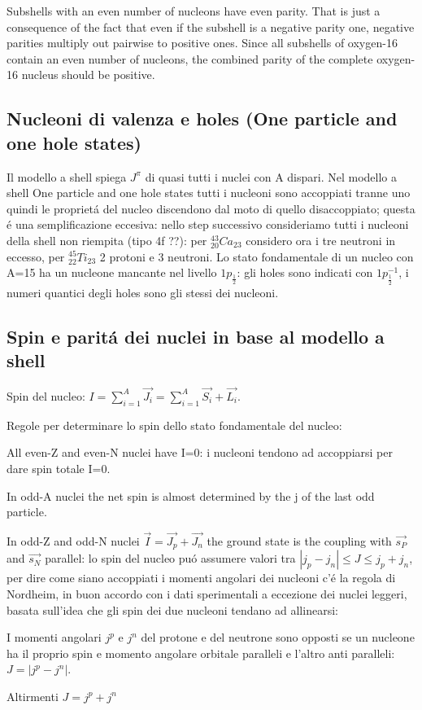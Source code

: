 \documentclass[main.tex]{subfiles}
\begin{document}
Subshells with an even number of nucleons have even parity.
That is just a consequence of the fact that even if the subshell is a negative parity one, negative parities multiply out pairwise to positive ones. Since all subshells of oxygen-16 contain an even number of nucleons, the combined parity of the complete oxygen-16 nucleus should be positive.


\subsection{Nucleoni di valenza e holes (One particle and one hole states)}
Il modello a shell spiega $J^\pi$ di quasi tutti i nuclei con A dispari.
Nel modello a shell One particle and one hole states tutti i nucleoni sono accoppiati tranne uno quindi le propriet\'a del nucleo discendono dal moto di quello disaccoppiato; questa \'e una semplificazione eccesiva: nello step successivo consideriamo tutti i nucleoni della shell non riempita (tipo 4f ??): per $^{43}_{20}Ca_{23}$ considero ora i tre neutroni in eccesso, per $^{45}_{22}Ti_{23}$ 2 protoni e 3 neutroni.
Lo stato fondamentale di un nucleo con A=15 ha un nucleone mancante nel livello $1p_\frac{1}{2}$: gli holes sono indicati con $1p_\frac{1}{2}^{-1}$, i numeri quantici degli holes sono gli stessi dei nucleoni.




\subsection{Spin e parit\'a dei nuclei in base al modello a shell}

Spin del nucleo: $I=\sum_{i=1}^A\vec{J_i}=\sum_{i=1}^A{\vec{S_i}+\vec{L_i}}$.

Regole per determinare lo spin dello stato fondamentale del nucleo:
\begin{enumerate*}
\item All even-Z and even-N nuclei have I=0: i nucleoni tendono ad accoppiarsi per dare spin totale I=0.
\item In odd-A nuclei the net spin is almost determined by the j of the last odd particle.
\item In odd-Z and odd-N nuclei $\vec{I}=\vec{J_p}+\vec{J_n}$ the ground state is the coupling with $\vec{s_P}$ and $\vec{s_N}$ parallel: lo spin del nucleo pu\'o assumere valori tra $|j_p-j_n|\leq J\leq j_p+j_n$, per dire come siano accoppiati i momenti angolari dei nucleoni c'\'e la regola di Nordheim, in buon accordo con i dati sperimentali a eccezione dei nuclei leggeri, basata sull'idea che gli spin dei due nucleoni tendano ad allinearsi:
\begin{enumerate*}
\item I momenti angolari $j^p$ e $j^n$ del protone e del neutrone sono opposti se un nucleone ha il proprio spin e momento angolare orbitale paralleli e l'altro anti paralleli: $J=|j^p-j^n|$.
\item Altirmenti $J=j^p+j^n$
\end{enumerate*}
\end{enumerate*}
\end{document}
